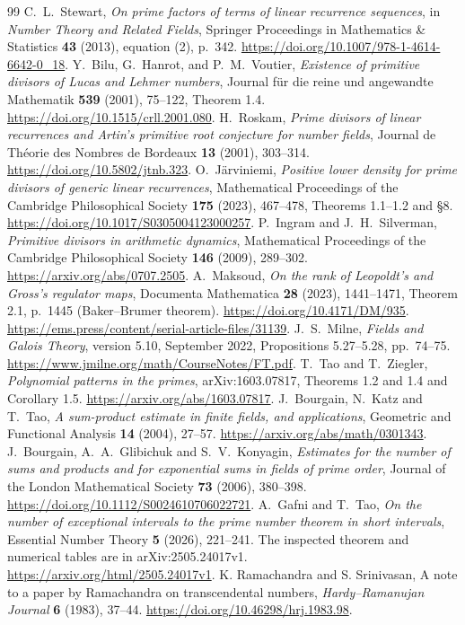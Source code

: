\documentclass[11pt,a4paper]{article}
\theoremstyle{definition}\newtheorem{definition}[theorem]{Definition}
\theoremstyle{remark}\newtheorem{remark}[theorem]{Remark}
\begin{document}
\begin{thebibliography}{99}
C.~L.~Stewart, \emph{On prime factors of terms of linear recurrence
sequences}, in \emph{Number Theory and Related Fields},
Springer Proceedings in Mathematics \& Statistics \textbf{43} (2013),
equation (2), p.~342.
\url{https://doi.org/10.1007/978-1-4614-6642-0_18}.
Y.~Bilu, G.~Hanrot, and P.~M.~Voutier,
\emph{Existence of primitive divisors of Lucas and Lehmer numbers},
Journal f\"ur die reine und angewandte Mathematik \textbf{539} (2001),
75--122, Theorem 1.4.
\url{https://doi.org/10.1515/crll.2001.080}.
H.~Roskam, \emph{Prime divisors of linear recurrences and Artin's
primitive root conjecture for number fields}, Journal de Th\'eorie des
Nombres de Bordeaux \textbf{13} (2001), 303--314.
\url{https://doi.org/10.5802/jtnb.323}.
O.~J\"arviniemi, \emph{Positive lower density for prime divisors of
generic linear recurrences}, Mathematical Proceedings of the Cambridge
Philosophical Society \textbf{175} (2023), 467--478,
Theorems 1.1--1.2 and \S8.
\url{https://doi.org/10.1017/S0305004123000257}.
P.~Ingram and J.~H.~Silverman, \emph{Primitive divisors in arithmetic
dynamics}, Mathematical Proceedings of the Cambridge Philosophical Society
\textbf{146} (2009), 289--302.
\url{https://arxiv.org/abs/0707.2505}.
A.~Maksoud, \emph{On the rank of Leopoldt's and Gross's regulator maps},
Documenta Mathematica \textbf{28} (2023), 1441--1471,
Theorem 2.1, p.~1445 (Baker--Brumer theorem).
\url{https://doi.org/10.4171/DM/935}.
\url{https://ems.press/content/serial-article-files/31139}.
J.~S.~Milne, \emph{Fields and Galois Theory}, version 5.10,
September 2022, Propositions 5.27--5.28, pp.~74--75.
\url{https://www.jmilne.org/math/CourseNotes/FT.pdf}.
T.~Tao and T.~Ziegler,
\emph{Polynomial patterns in the primes},
arXiv:1603.07817, Theorems 1.2 and 1.4 and Corollary 1.5.
\url{https://arxiv.org/abs/1603.07817}.
J.~Bourgain, N.~Katz and T.~Tao,
\emph{A sum-product estimate in finite fields, and applications},
Geometric and Functional Analysis \textbf{14} (2004), 27--57.
\url{https://arxiv.org/abs/math/0301343}.
J.~Bourgain, A.~A.~Glibichuk and S.~V.~Konyagin,
\emph{Estimates for the number of sums and products and for exponential
sums in fields of prime order},
Journal of the London Mathematical Society \textbf{73} (2006), 380--398.
\url{https://doi.org/10.1112/S0024610706022721}.
A.~Gafni and T.~Tao,
\emph{On the number of exceptional intervals to the prime number
theorem in short intervals},
Essential Number Theory \textbf{5} (2026), 221--241.
The inspected theorem and numerical tables are in arXiv:2505.24017v1.
\url{https://arxiv.org/html/2505.24017v1}.
K. Ramachandra and S. Srinivasan,
A note to a paper by Ramachandra on transcendental numbers,
\emph{Hardy--Ramanujan Journal} \textbf{6} (1983), 37--44.
\url{https://doi.org/10.46298/hrj.1983.98}.
\end{thebibliography}
\end{document}
